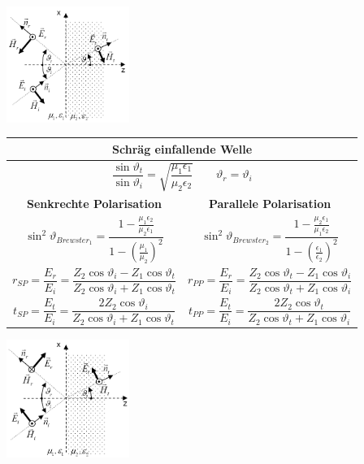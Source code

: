 		
		\begin{minipage}{4.3cm}
			\includegraphics[width=4cm]{./bilder/EMW_DHR_SchraegSenkrechtPolarisiert.png} 
        \end{minipage}
		\renewcommand{\arraystretch}{1.6}
		\begin{tabular}{| c || c | }
			\hline
				\multicolumn{2}{|c|}{\textbf{Schräg einfallende Welle}} \\
			\hline
				\multicolumn{2}{|c|}{$\dfrac{\sin{\vartheta_t}}{\sin{\vartheta_i}} = \sqrt{\dfrac{\mu_1
				\epsilon_1}{\mu_2 \epsilon_2}} \qquad \vartheta_r = \vartheta_i$} \\
			\hline
				\textbf{Senkrechte Polarisation}
				& 
				\textbf{Parallele Polarisation} \\	
			\hline		
				$ \sin^2 \vartheta_{Brewster_1} = \dfrac{1 - \frac{\mu_1 \epsilon_2}{\mu_2 \epsilon_1}}{1 -
				\left(\frac{\mu_1}{\mu_2}\right)^2}$ 
				& $ \sin^2 \vartheta_{Brewster_2} = \dfrac{1 - \frac{\mu_2 \epsilon_1}{\mu_1 \epsilon_2}}{1 -
				\left(\frac{\epsilon_1}{\epsilon_2}\right)^2}$ \\
				$r_{SP} = \dfrac{E_r}{E_i} = \dfrac{Z_2 \cos{\vartheta_i} - Z_1 \cos{\vartheta_t}}{Z_2
				\cos{\vartheta_i} + Z_1 \cos{\vartheta_t}}$
				& $r_{PP} = \dfrac{E_r}{E_i} = \dfrac{Z_2 \cos{\vartheta_t} - Z_1 \cos{\vartheta_i}}{Z_2
				\cos{\vartheta_t} + Z_1 \cos{\vartheta_i}}$ \\
				$t_{SP} =  \dfrac{E_t}{E_i} = \dfrac{2 Z_2 \cos{\vartheta_i}}{Z_2 \cos{\vartheta_i} + Z_1
				\cos{\vartheta_t}}$
				& $t_{PP} = \dfrac{E_t}{E_i} =  \dfrac{2 Z_2 \cos{\vartheta_t}}{Z_2 \cos{\vartheta_t} + Z_1
				\cos{\vartheta_i}}$ \\
			\hline
   		\end{tabular}
		\renewcommand{\arraystretch}{1}	
		\begin{minipage}{4.3cm}
			\includegraphics[width=4cm]{./bilder/EMW_DHR_SchraegParallelPolarisiert.png} 
        \end{minipage}	
		
